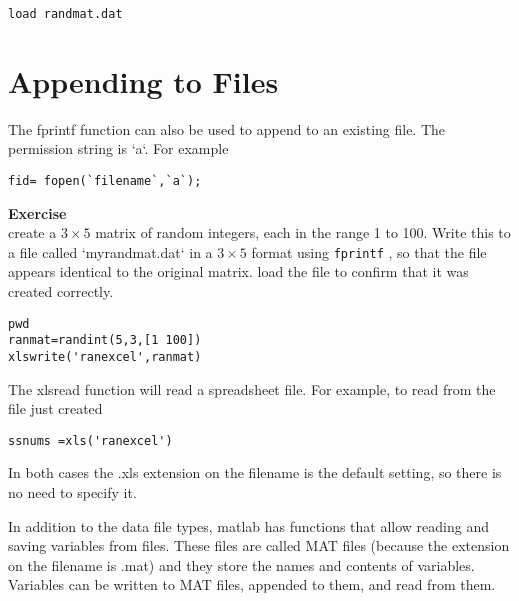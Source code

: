 \begin{framed}
\begin{verbatim}
load randmat.dat
\end{verbatim}
\end{framed}
\section{Appending to Files}
The fprintf function can also be used to append to an existing file.
The permission string is `a`. For example
\begin{framed}
\begin{verbatim}
fid= fopen(`filename`,`a`);
\end{verbatim}
\end{framed}
\textbf{Exercise}\\
create a $3 \times 5$ matrix of random integers, each in the range 1 to 100.
Write this to a file called `myrandmat.dat` in a $3 \times 5$ format using \texttt{fprintf}
, so that the file appears identical to the original matrix.
load the file to confirm that it was created correctly.


\begin{framed}
\begin{verbatim}
pwd
ranmat=randint(5,3,[1 100])
xlswrite('ranexcel',ranmat)

\end{verbatim}
\end{framed}
The xlsread function will read a spreadsheet file. For example, to read
from the file just created
\begin{framed}
\begin{verbatim}
ssnums =xls('ranexcel')
\end{verbatim}
\end{framed}
In both cases the .xls extension on the filename is the default setting, so there is no need to specify it.



In addition to the data file types, matlab has functions that allow reading
and saving variables from files. These files are called MAT files (because 
the extension on the filename is .mat) and they store the names and contents
of variables. Variables can be written to MAT files, appended to them, and
read from them.

